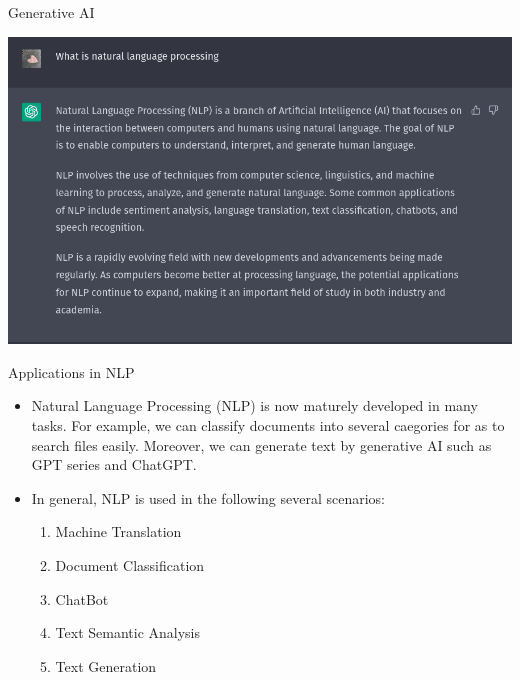 \begin{frame}[fragile]{Generative AI}

  \includegraphics[scale=0.35]{../images/img_1.png}

\end{frame}

\begin{frame}[fragile]{Applications in NLP}

  \begin{itemize}
    \item Natural Language Processing (NLP) is now maturely developed in many tasks. For example, we can classify documents into several caegories for as to search files easily. Moreover, we can generate text by generative AI such as GPT series and ChatGPT.
    \item In general, NLP is used in the following several scenarios:
          \begin{enumerate}
            \item Machine Translation
            \item Document Classification
            \item ChatBot
            \item Text Semantic Analysis
            \item Text Generation
          \end{enumerate}
  \end{itemize}

\end{frame}